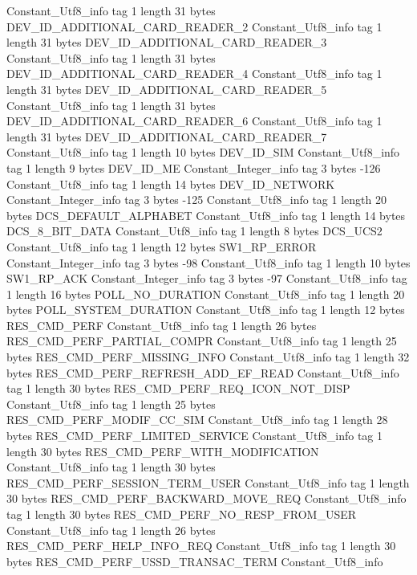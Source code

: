 {{{		}
		Constant_Utf8_info {
			tag	1
			length	31
			bytes	DEV_ID_ADDITIONAL_CARD_READER_2
		}
		Constant_Utf8_info {
			tag	1
			length	31
			bytes	DEV_ID_ADDITIONAL_CARD_READER_3
		}
		Constant_Utf8_info {
			tag	1
			length	31
			bytes	DEV_ID_ADDITIONAL_CARD_READER_4
		}
		Constant_Utf8_info {
			tag	1
			length	31
			bytes	DEV_ID_ADDITIONAL_CARD_READER_5
		}
		Constant_Utf8_info {
			tag	1
			length	31
			bytes	DEV_ID_ADDITIONAL_CARD_READER_6
		}
		Constant_Utf8_info {
			tag	1
			length	31
			bytes	DEV_ID_ADDITIONAL_CARD_READER_7
		}
		Constant_Utf8_info {
			tag	1
			length	10
			bytes	DEV_ID_SIM
		}
		Constant_Utf8_info {
			tag	1
			length	9
			bytes	DEV_ID_ME
		}
		Constant_Integer_info {
			tag	3
			bytes	-126
		}
		Constant_Utf8_info {
			tag	1
			length	14
			bytes	DEV_ID_NETWORK
		}
		Constant_Integer_info {
			tag	3
			bytes	-125
		}
		Constant_Utf8_info {
			tag	1
			length	20
			bytes	DCS_DEFAULT_ALPHABET
		}
		Constant_Utf8_info {
			tag	1
			length	14
			bytes	DCS_8_BIT_DATA
		}
		Constant_Utf8_info {
			tag	1
			length	8
			bytes	DCS_UCS2
		}
		Constant_Utf8_info {
			tag	1
			length	12
			bytes	SW1_RP_ERROR
		}
		Constant_Integer_info {
			tag	3
			bytes	-98
		}
		Constant_Utf8_info {
			tag	1
			length	10
			bytes	SW1_RP_ACK
		}
		Constant_Integer_info {
			tag	3
			bytes	-97
		}
		Constant_Utf8_info {
			tag	1
			length	16
			bytes	POLL_NO_DURATION
		}
		Constant_Utf8_info {
			tag	1
			length	20
			bytes	POLL_SYSTEM_DURATION
		}
		Constant_Utf8_info {
			tag	1
			length	12
			bytes	RES_CMD_PERF
		}
		Constant_Utf8_info {
			tag	1
			length	26
			bytes	RES_CMD_PERF_PARTIAL_COMPR
		}
		Constant_Utf8_info {
			tag	1
			length	25
			bytes	RES_CMD_PERF_MISSING_INFO
		}
		Constant_Utf8_info {
			tag	1
			length	32
			bytes	RES_CMD_PERF_REFRESH_ADD_EF_READ
		}
		Constant_Utf8_info {
			tag	1
			length	30
			bytes	RES_CMD_PERF_REQ_ICON_NOT_DISP
		}
		Constant_Utf8_info {
			tag	1
			length	25
			bytes	RES_CMD_PERF_MODIF_CC_SIM
		}
		Constant_Utf8_info {
			tag	1
			length	28
			bytes	RES_CMD_PERF_LIMITED_SERVICE
		}
		Constant_Utf8_info {
			tag	1
			length	30
			bytes	RES_CMD_PERF_WITH_MODIFICATION
		}
		Constant_Utf8_info {
			tag	1
			length	30
			bytes	RES_CMD_PERF_SESSION_TERM_USER
		}
		Constant_Utf8_info {
			tag	1
			length	30
			bytes	RES_CMD_PERF_BACKWARD_MOVE_REQ
		}
		Constant_Utf8_info {
			tag	1
			length	30
			bytes	RES_CMD_PERF_NO_RESP_FROM_USER
		}
		Constant_Utf8_info {
			tag	1
			length	26
			bytes	RES_CMD_PERF_HELP_INFO_REQ
		}
		Constant_Utf8_info {
			tag	1
			length	30
			bytes	RES_CMD_PERF_USSD_TRANSAC_TERM
		}
		Constant_Utf8_info {
}}}
